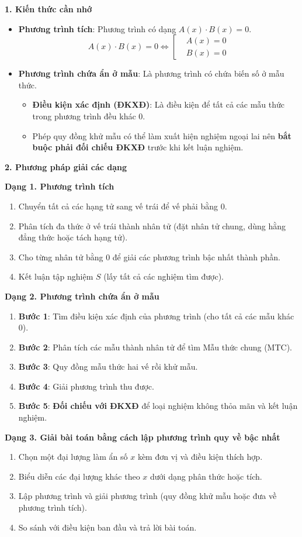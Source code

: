 \textbf{1. Kiến thức cần nhớ}
\begin{itemize}
\item \textbf{Phương trình tích}: Phương trình có dạng $A(x) \cdot B(x) = 0$.
$$\boxed{A(x) \cdot B(x) = 0 \iff \left[\begin{aligned} &A(x) = 0 \\ &B(x) = 0 \end{aligned}\right.}$$
\item \textbf{Phương trình chứa ẩn ở mẫu}: Là phương trình có chứa biến số ở mẫu thức.
\begin{itemize}
\item \textbf{Điều kiện xác định (ĐKXĐ)}: Là điều kiện để tất cả các mẫu thức trong phương trình đều khác $0$.
\item Phép quy đồng khử mẫu có thể làm xuất hiện nghiệm ngoại lai nên \textbf{bắt buộc phải đối chiếu ĐKXĐ} trước khi kết luận nghiệm.
\end{itemize}
\end{itemize}

\textbf{2. Phương pháp giải các dạng}

\textbf{Dạng 1. Phương trình tích}
\begin{enumerate}
\item Chuyển tất cả các hạng tử sang vế trái để vế phải bằng $0$.
\item Phân tích đa thức ở vế trái thành nhân tử (đặt nhân tử chung, dùng hằng đẳng thức hoặc tách hạng tử).
\item Cho từng nhân tử bằng $0$ để giải các phương trình bậc nhất thành phần.
\item Kết luận tập nghiệm $S$ (lấy tất cả các nghiệm tìm được).
\end{enumerate}

\textbf{Dạng 2. Phương trình chứa ẩn ở mẫu}
\begin{enumerate}
\item \textbf{Bước 1}: Tìm điều kiện xác định của phương trình (cho tất cả các mẫu khác $0$).
\item \textbf{Bước 2}: Phân tích các mẫu thành nhân tử để tìm Mẫu thức chung (MTC).
\item \textbf{Bước 3}: Quy đồng mẫu thức hai vế rồi khử mẫu.
\item \textbf{Bước 4}: Giải phương trình thu được.
\item \textbf{Bước 5}: \textbf{Đối chiếu với ĐKXĐ} để loại nghiệm không thỏa mãn và kết luận nghiệm.
\end{enumerate}

\textbf{Dạng 3. Giải bài toán bằng cách lập phương trình quy về bậc nhất}
\begin{enumerate}
\item Chọn một đại lượng làm ẩn số $x$ kèm đơn vị và điều kiện thích hợp.
\item Biểu diễn các đại lượng khác theo $x$ dưới dạng phân thức hoặc tích.
\item Lập phương trình và giải phương trình (quy đồng khử mẫu hoặc đưa về phương trình tích).
\item So sánh với điều kiện ban đầu và trả lời bài toán.
\end{enumerate}
